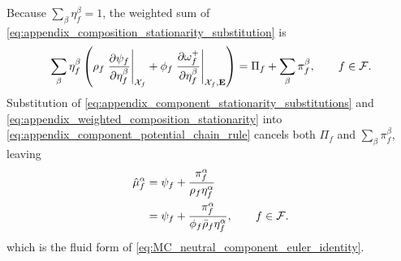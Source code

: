 %
Because \(\sum_\beta\eta_f^\beta=1\), the weighted sum of
\eqref{eq:appendix_composition_stationarity_substitution} is
%
\begin{equation}
	\sum_\beta\eta_f^\beta
	\left(
		\rho_f
		\left.
		\frac{\partial \psi_f}{\partial \eta_f^\beta}
		\right\vert_{\mathcal{X}_f}
		+
		\phi_f
		\left.
		\frac{\partial \omega_f^+}{\partial \eta_f^\beta}
		\right\vert_{\mathcal{X}_f,\mathbf{E}}
	\right)
	=
	\Pi_f+\sum_\beta\pi_f^\beta,
	\qquad
	f\in\mathcal{F} .
	\label{eq:appendix_weighted_composition_stationarity}
\end{equation}
%
Substitution of
\eqref{eq:appendix_component_stationarity_substitutions} and
\eqref{eq:appendix_weighted_composition_stationarity} into
\eqref{eq:appendix_component_potential_chain_rule} cancels both
\(\Pi_f\) and \(\sum_\beta\pi_f^\beta\), leaving
%
\begin{align}
	\hat\mu_f^\alpha
	&=
	\psi_f
	+
	\frac{\pi_f^\alpha}{\rho_f\eta_f^\alpha}
	\notag \\
	&=
	\psi_f
	+
	\frac{\pi_f^\alpha}
	{\phi_f\bar\rho_f\eta_f^\alpha},
	\qquad
	f\in\mathcal{F} .
	\label{eq:appendix_neutral_component_euler_result}
\end{align}
%
which is the fluid form of
\eqref{eq:MC_neutral_component_euler_identity}.

